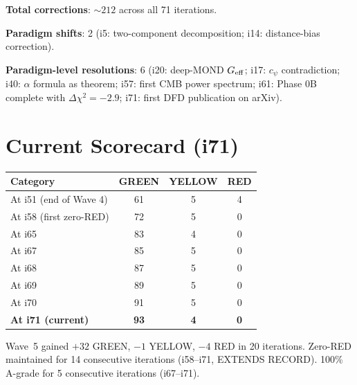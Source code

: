 \documentclass[11pt,a4paper]{article}
\begin{document}
\textbf{Total corrections}: $\sim 212$ across all 71 iterations.

\textbf{Paradigm shifts}: 2 (i5: two-component decomposition; i14: distance-bias correction).

\textbf{Paradigm-level resolutions}: 6 (i20: deep-MOND $G_{\rm eff}$; i17: $c_\psi$ contradiction; i40: $\alpha$ formula as theorem; i57: first CMB power spectrum; i61: Phase 0B complete with $\Delta\chi^2 = -2.9$; i71: first DFD publication on arXiv).

\section{Current Scorecard (i71)}

\begin{center}
\begin{tabular}{lccc}
\toprule
\textbf{Category} & \textbf{GREEN} & \textbf{YELLOW} & \textbf{RED} \\
\midrule
At i51 (end of Wave 4) & 61 & 5 & 4 \\
At i58 (first zero-RED) & 72 & 5 & 0 \\
At i65 & 83 & 4 & 0 \\
At i67 & 85 & 5 & 0 \\
At i68 & 87 & 5 & 0 \\
At i69 & 89 & 5 & 0 \\
At i70 & 91 & 5 & 0 \\
\textbf{At i71 (current)} & \textbf{93} & \textbf{4} & \textbf{0} \\
\bottomrule
\end{tabular}
\end{center}

\noindent
Wave~5 gained $+32$ GREEN, $-1$ YELLOW, $-4$ RED in 20 iterations.
Zero-RED maintained for 14 consecutive iterations (i58--i71, EXTENDS RECORD).
100\% A-grade for 5 consecutive iterations (i67--i71).
\end{document}
